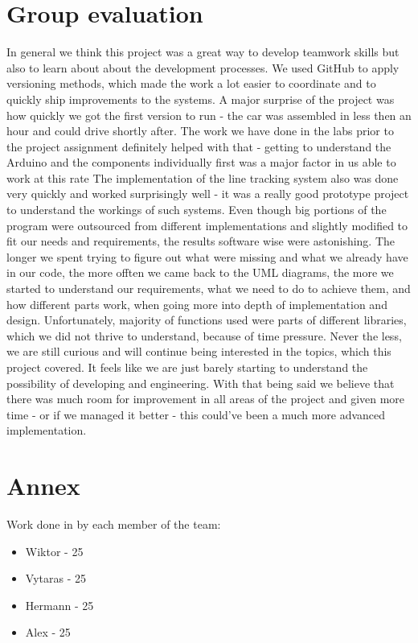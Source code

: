 \documentclass[conference]{IEEEtran}
\begin{document}
\section{Group evaluation}
In general we think this project was a great way to develop teamwork skills but also to learn about about the development processes. We used GitHub to apply versioning methods, which made the work a lot easier to coordinate and to quickly ship improvements to the systems. A major surprise of the project was how quickly we got the first version to run - the car was assembled in less then an hour and could drive shortly after. The work we have done in the labs prior to the project assignment definitely helped with that - getting to understand the Arduino and the components individually first was a major factor in us able to work at this rate The implementation of the line tracking system also was done very quickly and worked surprisingly well - it was a really good prototype project to understand the workings of such systems. Even though big portions of the program were outsourced from different implementations and slightly modified to fit our needs and requirements, the results software wise were astonishing. The longer we spent trying to figure out what were missing and what we already have in our code, the more offten we came back to the UML diagrams, the more we started to understand our requirements, what we need to do to achieve them, and how different parts work, when going more into depth of implementation and design. Unfortunately, majority of functions used were parts of different libraries, which we did not thrive to understand, because of time pressure. Never the less, we are still curious and will continue being interested in the topics, which this project covered. It feels like we are just barely starting to understand the possibility of developing and engineering. With that being said we believe that there was much room for improvement in all areas of the project and given more time - or if we managed it better - this could've been a much more advanced implementation.

\section{Annex}

Work done in \text{\%} by each member of the team:
\begin{itemize}
\item Wiktor - 25\text{\%}
\item Vytaras - 25\text{\%}
\item Hermann - 25\text{\%}
\item Alex - 25\text{\%}
\end{itemize}
\end{document}

